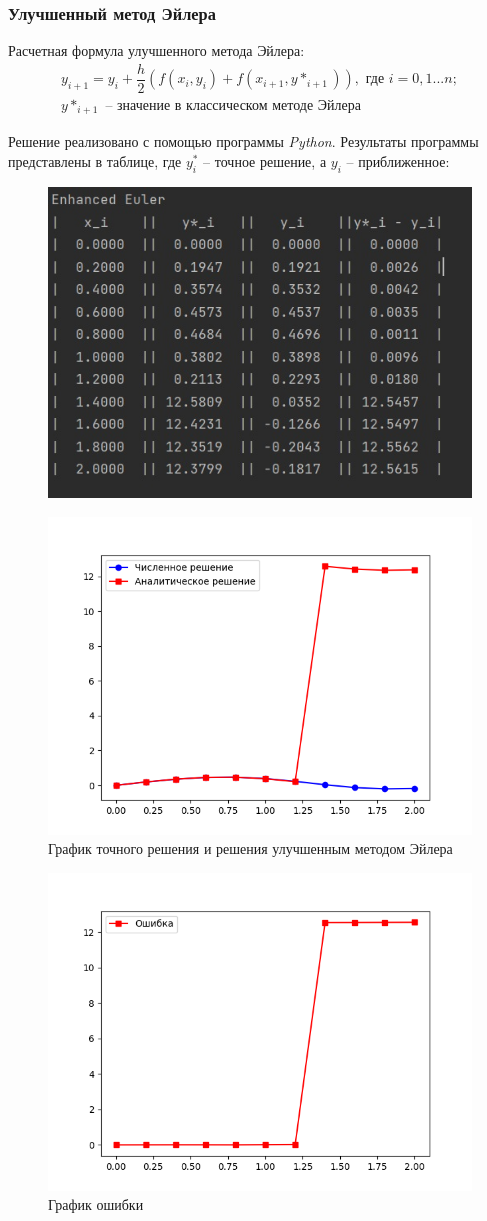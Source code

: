 \documentclass[a4paper, 14pt, fleqn]{extarticle}
\begin{document}
			\subsubsection{Улучшенный метод Эйлера}
			
				Расчетная формула улучшенного метода Эйлера:
				\begin{multline} 
					y_{i+1}=y_i+\dfrac{h}{2}(f(x_i,y_i)+f(x_{i+1},y*_{i+1})), \text{ где } i=0,1...n;\\y*_{i+1}\text{ -- значение в классическом методе Эйлера}
				\end{multline}
				
				Решение реализовано с помощью программы \textit{Python}. Результаты программы представлены в таблице, где $y^*_i$ -- точное решение, а $y_i$ -- приближенное:
				\begin{figure}[h]
					\centering
					\includegraphics[width = 0.6\linewidth]{2.jpg}
				\end{figure}
				\pagebreak
				\begin{figure}[h]
					\centering
					\includegraphics[width = 0.6\linewidth]{euler-enhanced.png}
					\caption{График точного решения и решения улучшенным методом Эйлера}
				\end{figure}
				\begin{figure}[h]
					\centering
					\includegraphics[width = 0.6\linewidth]{euler-enhanced-error.png}
					\caption{График ошибки}
				\end{figure}
			\pagebreak
				
\end{document}
